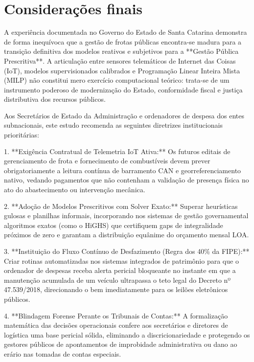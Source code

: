 \documentclass[12pt,a4paper]{article}
\begin{document}
\section{Considerações finais}

A experiência documentada no Governo do Estado de Santa Catarina demonstra de forma inequívoca que a gestão de frotas públicas encontra-se madura para a transição definitiva dos modelos reativos e subjetivos para a **Gestão Pública Prescritiva**. A articulação entre sensores telemáticos de Internet das Coisas (IoT), modelos supervisionados calibrados e Programação Linear Inteira Mista (MILP) não constitui mero exercício computacional teórico: trata-se de um instrumento poderoso de modernização do Estado, conformidade fiscal e justiça distributiva dos recursos públicos.

Aos Secretários de Estado da Administração e ordenadores de despesa dos entes subnacionais, este estudo recomenda as seguintes diretrizes institucionais prioritárias:

1. **Exigência Contratual de Telemetria IoT Ativa:** Os futuros editais de gerenciamento de frota e fornecimento de combustíveis devem prever obrigatoriamente a leitura contínua de barramento CAN e georreferenciamento nativo, vedando pagamentos que não contenham a validação de presença física no ato do abastecimento ou intervenção mecânica.

2. **Adoção de Modelos Prescritivos com Solver Exato:** Superar heurísticas gulosas e planilhas informais, incorporando nos sistemas de gestão governamental algoritmos exatos (como o HiGHS) que certifiquem gaps de integralidade próximos de zero e garantam a distribuição equânime do orçamento mensal LOA.

3. **Instituição do Fluxo Contínuo de Desfazimento (Regra dos 40\% da FIPE):** Criar rotinas automatizadas nos sistemas integrados de patrimônio para que o ordenador de despesas receba alerta pericial bloqueante no instante em que a manutenção acumulada de um veículo ultrapassa o teto legal do Decreto nº 47.539/2018, direcionando o bem imediatamente para os leilões eletrônicos públicos.

4. **Blindagem Forense Perante os Tribunais de Contas:** A formalização matemática das decisões operacionais confere aos secretários e diretores de logística uma base pericial sólida, eliminando a discricionariedade e protegendo os gestores públicos de apontamentos de improbidade administrativa ou dano ao erário nas tomadas de contas especiais.
\end{document}

